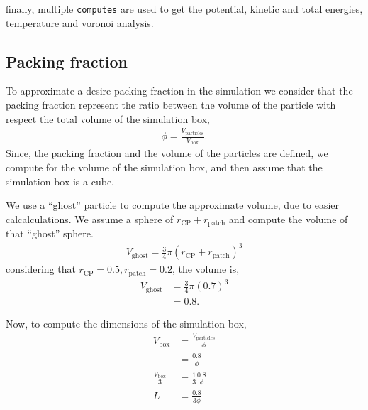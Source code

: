 \documentclass[main.tex]{subfiles}
\begin{document}
finally, multiple \verb|computes| are used to get the potential, kinetic and total energies, temperature and voronoi analysis.

\subsection{Packing fraction}

To approximate a desire packing fraction in the simulation we consider that the packing fraction represent the ratio between the volume of the particle with respect the total volume of the simulation box,
\begin{gather*}
    \phi = \frac{V_{\mathrm{particles}}}{V_\mathrm{box}}.
\end{gather*}
Since, the packing fraction and the volume of the particles are defined, we compute for the volume of the simulation box, and then assume that the simulation box is a cube.

We use a ``ghost'' particle to compute the approximate volume, due to easier calcalculations.
We assume a sphere of $r_{\mathrm{CP}}+r_{\mathrm{patch}}$ and compute the volume of that ``ghost'' sphere.
\begin{gather*}
    V_{\mathrm{ghost}} = \frac{3}{4}\pi (r_{\mathrm{CP}}+r_{\mathrm{patch}})^{3}
\end{gather*}
considering that $r_{\mathrm{CP}}=0.5, r_{\mathrm{patch}}=0.2$, the volume is,
\begin{align*}
    V_{\mathrm{ghost}} &= \frac{3}{4}\pi (0.7)^{3} \\
                       &= 0.8.
\end{align*}

Now, to compute the dimensions of the simulation box,
\begin{align*}
    V_\mathrm{box} &= \frac{V_{\mathrm{particles}}}{\phi} \\
                   &= \frac{0.8}{\phi} \\
    \frac{V_\mathrm{box}}{3}&= \frac{1}{3}\frac{0.8}{\phi} \\
    L &= \frac{0.8}{3\phi}
\end{align*}
\end{document}
